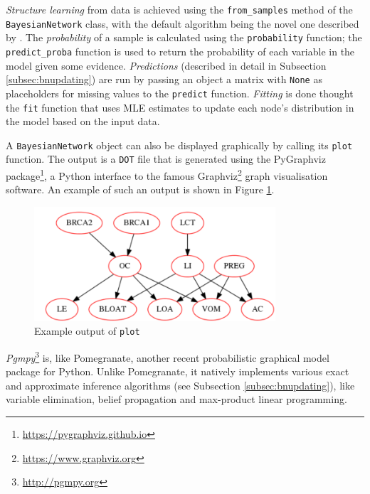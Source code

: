 \textit{Structure learning} from data is achieved using the \texttt{from\_samples} method of the \\ \texttt{BayesianNetwork} class, with the default algorithm being the novel one described by \citet{schreiber_noble_2017}.
The \textit{probability} of a sample is calculated using the \texttt{probability} function; the \texttt{predict\_proba} function is used to return the probability of each variable in the model given some evidence.
\textit{Predictions} (described in detail in Subsection \ref{subsec:bnupdating}) are run by passing an object a matrix with \texttt{None} as placeholders for missing values to the \texttt{predict} function.
\textit{Fitting} is done thought the \texttt{fit} function that uses MLE estimates to update each node's distribution in the model based on the input data.

A \texttt{BayesianNetwork} object can also be displayed graphically by calling its \texttt{plot} function.
The output is a \texttt{DOT} file that is generated using the PyGraphviz package\footnote{\url{https://pygraphviz.github.io}}, a Python interface to the famous Graphviz\footnote{\url{https://www.graphviz.org}} graph visualisation software.
An example of such an output is shown in Figure \ref{fig:Pomegranate_graph_example}.

\begin{figure}[htbp]
\centerline{\includegraphics[width=0.8\textwidth]{methodology/images/Pomegranate_example}}
\caption{Example output of \texttt{plot} \citep{Pomegranatetutorial}}
\label{fig:Pomegranate_graph_example}
\end{figure}

\textit{Pgmpy}\footnote{\url{http://pgmpy.org}} is, like Pomegranate, another recent probabilistic graphical model package for Python.
Unlike Pomegranate, it natively implements various exact and approximate inference algorithms (see Subsection \ref{subsec:bnupdating}), like variable elimination, belief propagation and max-product linear programming.

